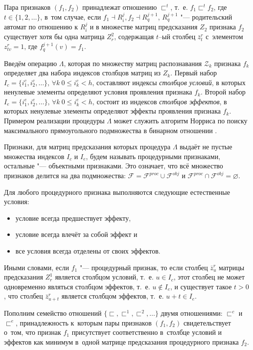 \documentclass[a4paper, 12pt]{article}
\theoremstyle{plain}
\begin{document}
	Пара признаков $(f_1,f_2)$ принадлежат отношению $\sqsubset^t$, т.~е. $f_1\sqsubset^t f_2$, где $t\in\{1,2,\dots\}$, в~том случае, если $f_1\dashv R_i^j, f_2\dashv R_q^{j+1}$, $R_q^{j+1}$ "--- родительский автомат по отношению к $R_i^j$ и в множестве матриц предсказания $Z_2$ признака $f_2$ существует хотя бы одна матрица $Z_r^2$, содержащая $t$–ый столбец $\bar z_t^r$ с~элементом $z_{tv}^r=1$, где $f_q^{j+1}(v)=f_1$.	
	
	Введём операцию $\Lambda$, которая по множеству матриц распознавания $\mathcal Z_k$ признака $f_k$ определяет два набора индексов столбцов матриц из $Z_k$. Первый набор $I_c=\{i_1^c,i_2^c,\dots\}$, $\forall k\ 0\leqslant i_k^c < h$, составляют индексы \textit{столбцов условий}, в которых ненулевые элементы определяют условия проявления признака $f_k$. Второй набор $I_e=\{i_1^e,i_2^e,\dots\}$, $\forall k\ 0\leqslant i_k^e < h$, состоит из индексов  \textit{столбцов эффектов}, в которых ненулевые элементы определяют эффекты проявления признака $f_k$. Примером реализации процедуры $\Lambda$ может служить алгоритм Норриса по поиску максимального прямоугольного подмножества в бинарном отношении \cite{Norris1977}.
	
	Признаки, для матриц предсказания которых процедура $\Lambda$ выдаёт не пустые множества индексов $I_c$ и $I_e$, будем называть процедурными признаками, остальные "--- объектными признаками. Это означает, что всё множество признаков делится на два подмножества: $\mathcal F=\mathcal F^{proc}\cup\mathcal F^{obj}$ и $\mathcal F^{proc}\cap\mathcal F^{obj}=\varnothing$.	

	Для любого процедурного признака выполняются следующие естественные условия:
	\begin{itemize}
		\item условие всегда предшествует эффекту,
		\item условие всегда влечёт за собой эффект и
		\item все условия всегда отделены от своих эффектов.
	\end{itemize}
		
	Иными словами, если $f_1$ "--- процедурный признак, то если столбец $\bar z_u^r$ матрицы предсказания $Z_r^1$ является столбцом условий, т.~е. $u\in{I_c}$, этот столбец не может одновременно являться столбцом эффектов, т.~е. $u\not\in I_e$, и существует такое $t>0$, что столбец $\bar z_{u+t}^r$ является столбцом эффектов, т.~е. $u+t\in I_e$.
		
	Пополним семейство отношений $\{\sqsubset,\sqsubset^1,\sqsubset^2,\dots\}$ двумя отношениями: $\sqsubset^c$ и $\sqsubset^e$, принадлежность к~которым пары признаков $(f_1,f_2)$ свидетельствует о~том, что признак $f_1$ присутствует соответственно в~столбце условий и эффектов как минимум в~одной матрице предсказания процедурного признака $f_2$.
		
\end{document}
